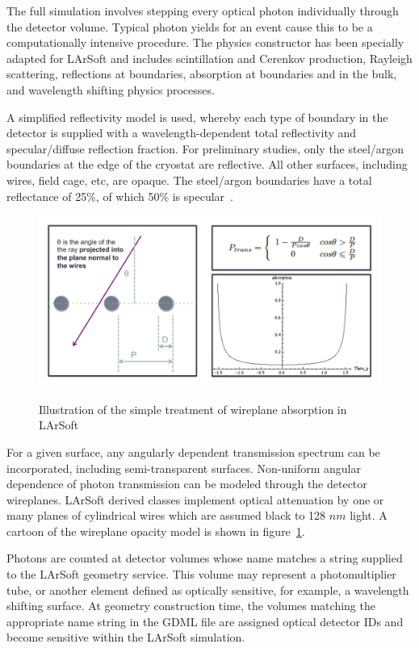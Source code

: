 \documentclass[12pt]{elsarticle}
\newcommand{\larsoft}{LArSoft }
\begin{document}
\label{sec:fullopticalsim}
The full simulation involves stepping every optical photon individually through the detector volume.  Typical photon yields for an event cause this to be a computationally intensive procedure. The physics constructor has been specially adapted for \larsoft and includes scintillation and Cerenkov production, Rayleigh scattering, reflections at boundaries, absorption at boundaries and in the bulk, and wavelength shifting physics processes.

A simplified reflectivity model is used, whereby each type of boundary in the detector is supplied with a wavelength-dependent total reflectivity and specular/diffuse reflection fraction.   For  preliminary  studies,  only the  steel/argon boundaries  at  the  edge of the cryostat are  reflective. All  other  surfaces,  including  wires,  field cage,  etc,  are opaque.  The steel/argon boundaries have a total reflectance of 25\%, of which 50\% is specular~\cite{reflectances}.

\begin{figure}[h]
\centering
\caption{Illustration of the simple treatment of wireplane absorption in \larsoft}
\includegraphics[width=6.0in]{./mtrls/imgs/WireplaneTransmissionCartoon.pdf}
\label{fig:wireplaneabs}
\end{figure}

For a given surface, any angularly dependent transmission spectrum can be incorporated, including semi-transparent surfaces.  Non-uniform angular dependence of photon transmission can be modeled through the detector wireplanes.    \larsoft derived classes implement optical attenuation by one or many planes of cylindrical wires which are assumed black to 128 $nm$ light. A cartoon of the wireplane opacity model is shown in figure~\ref{fig:wireplaneabs}.

Photons are counted at detector volumes whose name matches a string supplied to the \larsoft geometry service.  This volume may represent a photomultiplier tube, or another element defined as optically sensitive, for example, a wavelength shifting surface. At geometry construction time, the volumes matching the appropriate name string in the GDML file are assigned optical detector IDs and become sensitive within the \larsoft simulation.
\end{document}
